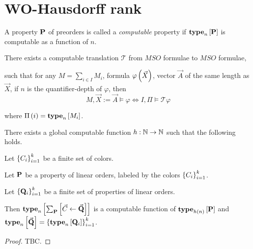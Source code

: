 \section{WO-Hausdorff rank}

\begin{definition}
    A property $\mathbf{P}$ of preorders is called a
    \emph{computable} property if
    $\mathbf{type}_{n} \left[ {\mathbf{P}} \right]$ is computable as a function of $n$.
\end{definition}

\begin{theorem}
    There exists a computable translation $\mathcal{T}$
    from $MSO$ formulae to $MSO$ formulae,

    such that for any $M = \sum_{i \in I} M_i$,
    formula $\varphi \left( {\vec{X}} \right)$,
    vector $\vec{A}$ of the same length as $\vec{X}$,
    if $n$ is the quantifier-depth of $\varphi$,
    then
    \[
        M, \vec{X} := \vec{A} \models \varphi \iff I, \Pi \models \mathcal{T} {\varphi}
    \]

    where $\Pi \left( {i} \right) = \mathbf{type}_{n} \left[ {M_i} \right]$.
\end{theorem}

\begin{lemma}
  There exists a global computable function
  $h : \mathbb{N} \to \mathbb{N}$ such that the following holds.

  Let $\left\{ {C_i} \right\}_{i=1}^k$ be a finite set of colors.

  Let $\mathbf{P}$ be a property of linear orders, labeled
  by the colors $\left\{ {C_i} \right\}_{i=1}^k$.

  Let $\left\{ {\mathbf{Q}_i} \right\}_{i=1}^k$ be a finite set of properties of linear orders.

  Then $\mathbf{type}_{n} \left[ {\sum_{\mathbf{P}} \left[ {{\vec{C}} \leftarrow {\vec{\mathbf{Q}}}} \right]} \right]$ is 
  a computable function of $\mathbf{type}_{h(n)} \left[ {\mathbf{P}} \right]$
  and $\mathbf{type}_{n} \left[ {\vec{\mathbf{Q}}} \right] = \left\{ {\mathbf{type}_{n} \left[ {\mathbf{Q}_i} \right]} \right\}_{i=1}^k$.
\end{lemma}

\begin{proof}
  TBC.
\end{proof}
